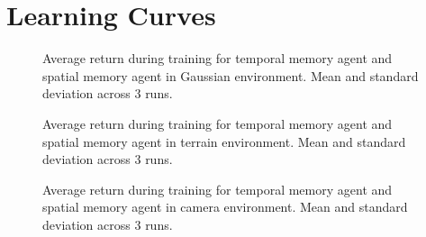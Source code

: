 \chapter{Learning Curves}
\label{app:learning}

\begin{figure}
    \centering
    
    \caption[Learning curves for Gaussian environment.]{Average return during training for temporal memory agent and spatial memory agent in Gaussian environment. Mean and standard deviation across 3 runs.}
    \label{fig:learning-gaussian}
\end{figure}

\begin{figure}
    \centering
    
    \caption[Learning curves for terrain environment.]{Average return during training for temporal memory agent and spatial memory agent in terrain environment. Mean and standard deviation across 3 runs.}
    \label{fig:learning-terrain}
\end{figure}

\begin{figure}
    \centering
    
    \caption[Learning curves for camera environment.]{Average return during training for temporal memory agent and spatial memory agent in camera environment. Mean and standard deviation across 3 runs.}
    \label{fig:learning-camera}
\end{figure}
